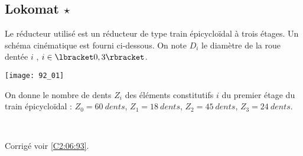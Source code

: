 \normaltrue \difficilefalse \tdifficilefalse
\correctionfalse


\subsection*{Lokomat $\star$ \label{C2:06:93}}
\setcounter{question}{0}


\ifcorrection
\else
{}
\fi

\ifprof
\else


Le réducteur utilisé est un réducteur de type train épicycloïdal à trois étages. Un schéma 
cinématique est fourni ci-dessous. 
On note $D_i$ le diamètre de la roue dentée $i$ , $i\in \lbracket 0,3 \rbracket$. 


\begin{center}
\texttt{[image: 92\_01]}
\end{center}

On donne le nombre de dents $Z_i$ des éléments constitutifs $i$ du premier étage du train épicycloïdal : 
 $Z_0 = \SI{60}{dents}$,  $Z_1 = \SI{18}{dents}$,  $Z_2 = \SI{45}{dents}$,  $Z_3 = \SI{24}{dents}$.
 
\fi


\ifprof
\else
\fi

\ifprof ~\\

\else
\fi

 

\ifprof
\else
\begin{flushright}
\footnotesize{Corrigé  voir \ref{C2:06:93}.}
\end{flushright}%
\fi